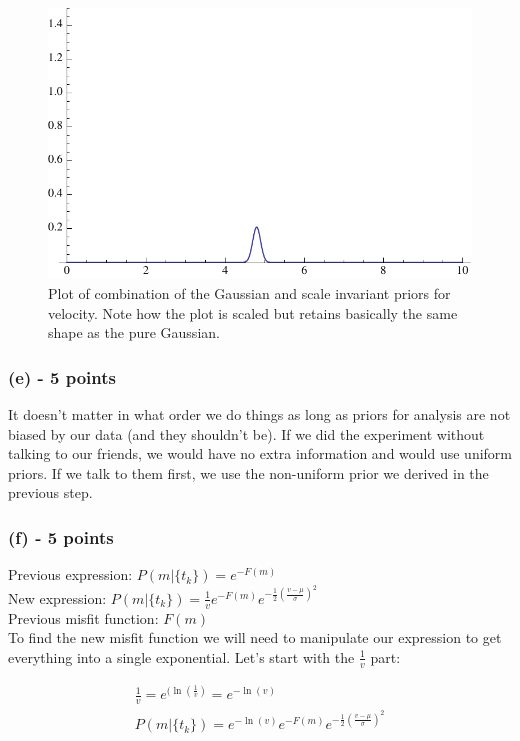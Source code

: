 \documentclass[11pt]{article}
\begin{document}
\begin{figure}
\begin{center}
  \includegraphics[width=12cm]{ESE118_PS4_P3_Fig3.pdf}
  \caption{Plot of combination of the Gaussian and scale invariant priors for velocity.  Note how the plot is scaled but retains basically the same shape as the pure Gaussian.}
  \end{center}
\end{figure}

\subsubsection*{(e) - 5 points}
It doesn't matter in what order we do things as long as priors for analysis are not biased by our data (and they shouldn't be).  If we did the experiment without talking to our friends, we would have no extra information and would use uniform priors.  If we talk to them first, we use the non-uniform prior we derived in the previous step.


\subsubsection*{(f) - 5 points}
Previous expression: $P(m|\{t_k\}) = e^{-F(m)}$ \\
New expression: $P(m|\{t_k\}) =  \frac{1}{v} e^{-F(m)} e^{-\frac{1}{2}(\frac{v-\mu}{\sigma})^2}$ \\

Previous misfit function: $F(m)$ \\
To find the new misfit function we will need to manipulate our expression to get everything into a single exponential.  Let's start with the $\frac{1}{v}$ part:

\begin{eqnarray*}
\frac{1}{v} = e^{(\ln(\frac{1}{v})} = e^{-\ln(v)} \\
P(m|\{t_k\}) = e^{-\ln(v)} e^{-F(m)} e^{-\frac{1}{2}(\frac{v-\mu}{\sigma})^2} \\
\end{eqnarray*}
\end{document}
